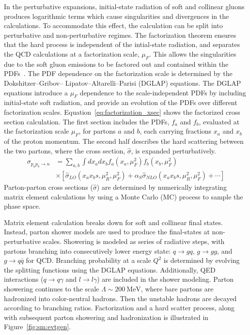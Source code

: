 In the perturbative expansions, initial-state radiation of soft and collinear gluons produces logarithmic terms which cause singularities and divergences in the calculations. To accommodate this effect, the calculation can be split into perturbative and non-perturbative regimes. The factorization theorem ensures that the hard process is independent of the intial-state radiation, and separates the QCD calculations at a factorization scale, $\mu_F$. This allows the singularities due to the soft gluon emissions to be factored out and contained within the PDFs~\cite{Collins:1989gx}. The PDF dependence on the factorization scale is determined by the Dokshitzer–Gribov– Lipatov–Altarelli–Parisi (DGLAP) equations. The DGLAP equations introduce a $\mu_F$ dependence to the scale-independent PDFs by including initial-state soft radiation, and provide an evolution of the PDFs over different factorization scales\cite{Gribov:1972ri,Dokshitzer:1977sg}.  Equation~\ref{eq:factorization_xsec} shows the factorized cross section calculation. The first section includes the PDFs, $f_{a}$ and $f_{b}$, evaluated at the factorization scale $\mu_F$, for partons $a$ and $b$, each carrying fractions $x_a$ and $x_b$ of the proton momentum. The second half describes the hard scattering between the two partons, where the cross section, $\hat{\sigma}$, is expanded perturbatively.  
\begin{equation}
\begin{aligned}
\sigma_{p_a p_b \rightarrow n} &= \sum_{a,b}{\int{dx_a dx_b f_{a}(x_a, \mu^2_F)f_{b}(x_b, \mu^2_F)}} \\ &\times[\hat{\sigma}_{LO}(x_a x_b s, \mu^2_R, \mu^2_F)+\alpha_S \hat{\sigma}_{NLO}(x_a x_b s, \mu^2_R, \mu^2_F) + \cdots]
    \label{eq:factorization_xsec}
\end{aligned}
\end{equation}
Parton-parton cross sections ($\hat{\sigma}$) are determined by numerically integrating matrix element calculations by using a Monte Carlo (MC) process to sample the phase space.

Matrix element calculation breaks down for soft and collinear final states. Instead, parton shower models are used to produce the final-states at non-perturbative scales. Showering is modeled as series of radiative steps, with partons branching into consecutively lower energy state: $q\rightarrow gq$, $g\rightarrow gg$, and $g\rightarrow q\bar{q}$ for QCD. Branching probability at a scale $Q^2$ is determined by evolving the splitting functions using the DGLAP equations. Additionally, QED interactions ($q\rightarrow q\gamma$ and $l\rightarrow l\gamma$) are included in the shower modeling. Parton showering continues to the scale $\Lambda\sim 200~\mathrm{MeV}$, where bare partons are hadronized into color-neutral hadrons. Then the unstable hadrons are decayed according to branching ratios. Factorization and a hard scatter process, along with subsequent parton showering and hadronization is illustrated in Figure~\ref{fig:sm:evtgen}.

